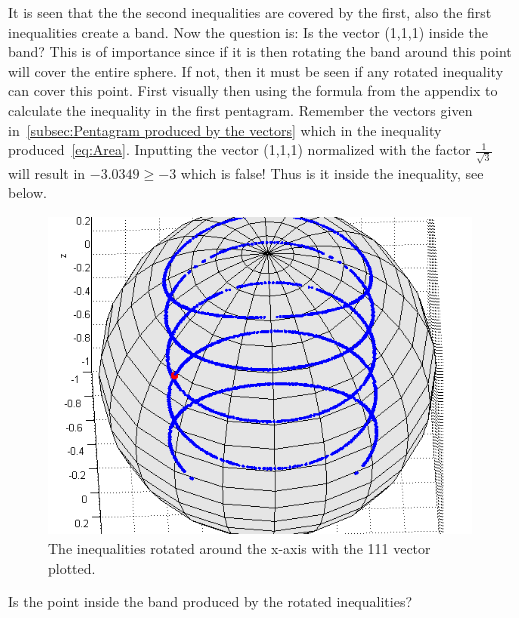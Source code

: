 It is seen that the the second inequalities are covered by the first, also the first inequalities create a band. Now the question is: Is the vector (1,1,1) inside the band? This is of importance since if it is then rotating the band around this point will cover the entire sphere. If not, then it must be seen if any rotated inequality can cover this point. First visually then using the formula from the appendix to calculate the inequality in the first pentagram. Remember the vectors given in~\ref{subsec:Pentagram produced by the vectors} which in the inequality produced~\eqref{eq:Area}. Inputting the vector (1,1,1) normalized with the factor $\frac{1}{\sqrt{3}}$ will result in $-3.0349 \geq -3$ which is false! Thus is it inside the inequality, see below.
\begin{figure}[H]
\begin{center}
\includegraphics[scale=0.5]{ine12all111.png}
\caption{The inequalities rotated around the x-axis with the 111 vector plotted.}
\label{fig:ine12all111}
\end{center}
\end{figure}
Is the point inside the band produced by the rotated inequalities?
